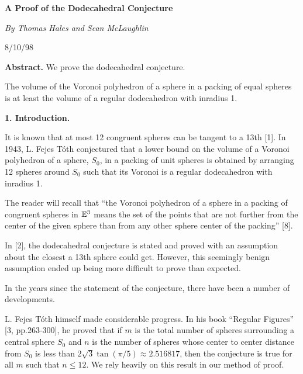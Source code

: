 \def\today{\ifcase\month\or
    January\or February\or March\or April\or May\or June\or
    July\or August\or September\or October\or November\or December\fi
    \space\number\day, \number\year}






\centerline{\bf{A Proof of the Dodecahedral Conjecture}}
\vskip 6pt
\centerline{\sl By Thomas Hales and Sean McLaughlin}
\bigskip
\centerline{8/10/98}
\bigskip

{\bf Abstract.}  We prove the dodecahedral conjecture.

\bigskip

 The volume of the Voronoi polyhedron of a sphere in a packing 
of equal spheres is at least the volume of a regular dodecahedron with inradius 1.
 \endproclaim

\bigskip

\centerline {{ \bf 1. Introduction.}}

\bigskip



It is known that at most 12 congruent spheres can be tangent to a 13th [1]. 
In 1943, L. Fejes T\'oth conjectured that a lower bound on the volume of a 
Voronoi polyhedron of a sphere, $S_0$, in a packing of unit spheres is obtained
 by arranging 12 spheres around $S_0$ such that its Voronoi is a 
regular dodecahedron with inradius 1. 

The reader will recall that ``the Voronoi polyhedron of a sphere in a packing of congruent
 spheres in $\Bbb E^3$ means the set of the points that are not further from the center of 
the given sphere than from any other sphere center of the packing'' [8].

In [2], the dodecahedral conjecture is stated and proved with an assumption 
about the closest
 a 13th sphere could get.  However, this seemingly benign assumption ended up being
 more difficult to prove than expected. 

In the years since the statement of the conjecture, there have been a number of 
developments.  

L. Fejes T\'oth himself made considerable progress.  In his book ``Regular Figures'' 
[3, pp.263-300], he proved that if $m$ is the total number of spheres surrounding 
a central sphere $S_0$ and $n$ is the number of spheres whose center to center 
distance from $S_0$ is less than  $2 \sqrt 3 \tan(\pi/5)\approx 2.516817$, then 
the conjecture is true for all $m$ such that $n\leq 12$.  We rely heavily 
on this result in our method of proof.

